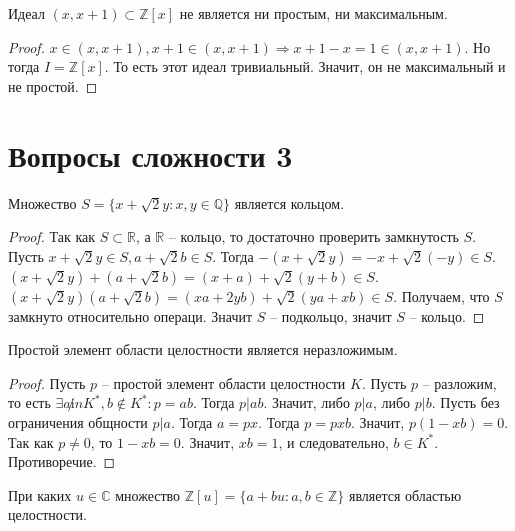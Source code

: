 \documentclass{article}
\begin{document}
\begin{statement}
    Идеал $(x, x + 1) \subset \mathbb{Z}[x]$ не является ни простым, ни максимальным.
\end{statement}

\begin{proof}
    $x \in (x, x+1), x+1 \in (x, x+1) \Rightarrow x+1 - x = 1 \in (x, x+1)$. Но тогда $I = \mathbb{Z}[x]$. То есть этот
    идеал тривиальный. Значит, он не максимальный и не простой.
\end{proof}

\section{Вопросы сложности 3}

\begin{statement}
    Множество $S = \{x + \sqrt{2}y : x, y \in \mathbb{Q}\}$ является кольцом.
\end{statement}

\begin{proof}
    Так как $S \subset \mathbb{R}$, а $\mathbb{R}$ -- кольцо, то достаточно проверить замкнутость $S$.
    Пусть $x + \sqrt{2}y \in S, a + \sqrt{2}b \in S$. Тогда $-(x + \sqrt{2}y) = -x + \sqrt{2}(-y) \in S$. $(x +
    \sqrt{2}y) + (a + \sqrt{2}b) = (x + a) + \sqrt{2}(y + b) \in S$. $(x + \sqrt{2}y)(a + \sqrt{2}b) = (xa + 2yb) +
    \sqrt{2}(ya + xb) \in S$. Получаем, что $S$ замкнуто относительно операци. Значит $S$ -- подкольцо, значит $S$ --
    кольцо.
\end{proof}

\begin{statement}
    Простой элемент области целостности является неразложимым.
\end{statement}

\begin{proof}
    Пусть $p$ -- простой элемент области целостности $K$. Пусть $p$ -- разложим, то есть $\exists a \not in K^*, b \not
    \in K^*: p = ab$. Тогда $p | ab$. Значит, либо $p | a$, либо $p | b$. Пусть без ограничения общности $p | a$. Тогда
    $a = px$. Тогда $p = pxb$. Значит, $p(1 - xb) = 0$. Так как $p \neq 0$, то $1 - xb = 0$. Значит, $xb = 1$, и
    следовательно, $b \in K^*$. Противоречие.
\end{proof}

\begin{statement}
    При каких $u \in \mathbb{C}$ множество $\mathbb{Z}[u] = \{a + bu : a, b \in \mathbb{Z}\}$ является областью
    целостности.
\end{statement}
\end{document}

